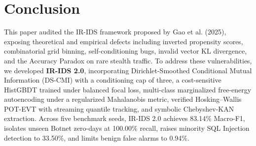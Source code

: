 \documentclass[5p,times,twocolumn]{elsarticle}
\begin{document}
\section{Conclusion}
This paper audited the IR-IDS framework proposed by Gao et al. (2025), exposing theoretical and empirical defects including inverted propensity scores, combinatorial grid binning, self-conditioning bugs, invalid vector KL divergence, and the Accuracy Paradox on rare stealth traffic. To address these vulnerabilities, we developed \textbf{IR-IDS 2.0}, incorporating Dirichlet-Smoothed Conditional Mutual Information (DS-CMI) with a conditioning cap of three, a cost-sensitive HistGBDT trained under balanced focal loss, multi-class marginalized free-energy autoencoding under a regularized Mahalanobis metric, verified Hosking--Wallis POT-EVT with streaming quantile tracking, and symbolic Chebyshev-KAN extraction. Across five benchmark seeds, IR-IDS 2.0 achieves 83.14\% Macro-F1, isolates unseen Botnet zero-days at 100.00\% recall, raises minority SQL Injection detection to 33.50\%, and limits benign false alarms to 0.94\%.



\end{document}
